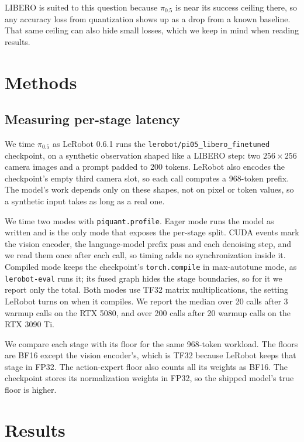 \documentclass[12pt,letterpaper]{article}
\begin{document}
LIBERO is suited to this question because $\pi_{0.5}$ is near its success ceiling there, so any accuracy loss from quantization shows up as a drop from a known baseline. That same ceiling can also hide small losses, which we keep in mind when reading results.

\section{Methods}

\subsection{Measuring per-stage latency}

We time $\pi_{0.5}$ as LeRobot 0.6.1 runs the \texttt{lerobot/pi05\_libero\_finetuned} checkpoint, on a synthetic observation shaped like a LIBERO step: two $256 \times 256$ camera images and a prompt padded to 200 tokens. LeRobot also encodes the checkpoint's empty third camera slot, so each call computes a 968-token prefix. The model's work depends only on these shapes, not on pixel or token values, so a synthetic input takes as long as a real one.

We time two modes with \texttt{piquant.profile}. Eager mode runs the model as written and is the only mode that exposes the per-stage split. CUDA events mark the vision encoder, the language-model prefix pass and each denoising step, and we read them once after each call, so timing adds no synchronization inside it. Compiled mode keeps the checkpoint's \texttt{torch.compile} in max-autotune mode, as \texttt{lerobot-eval} runs it; its fused graph hides the stage boundaries, so for it we report only the total. Both modes use TF32 matrix multiplications, the setting LeRobot turns on when it compiles. We report the median over 20 calls after 3 warmup calls on the RTX 5080, and over 200 calls after 20 warmup calls on the RTX 3090 Ti.

We compare each stage with its floor for the same 968-token workload. The floors are BF16 except the vision encoder's, which is TF32 because LeRobot keeps that stage in FP32. The action-expert floor also counts all its weights as BF16. The checkpoint stores its normalization weights in FP32, so the shipped model's true floor is higher.

\section{Results}
\end{document}
